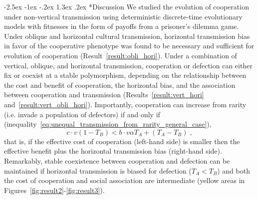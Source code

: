 \documentclass[12pt]{extarticle}
\makeatletter
\renewcommand\section{\@startsection {section}{1}{\z@}%
     {-2.5ex \@plus -1ex \@minus -.2ex}%
     {1.3ex \@plus.2ex}%
    {\Large\bfseries}}
\makeatother
\begin{document}
{\section*{Discussion}
We studied the evolution of cooperation under non-vertical transmission using deterministic discrete-time evolutionary models with fitnesses in the form of payoffs from a prisoner's dilemma game. 
Under oblique and horizontal cultural transmission, horizontal transmission bias in favor of the cooperative phenotype was found to be necessary and sufficient for evolution of cooperation (Result~\autoref{result:obli_hori}).
Under a combination of vertical, oblique, and horizontal transmission, cooperation or defection can either fix or coexist at a stable polymorphism, depending on the relationship between the cost and benefit of cooperation, the horizontal bias, and the association between cooperation and transmission (Results~\autoref{result:vert_hori} and~\autoref{result:vert_obli_hori}).
Importantly, cooperation can increase from rarity (i.e. invade a population of defectors) if and only if (inequality~\ref{eq:unequal_transmission_from_rarity_general_case}),
\begin{equation}
c \cdot v (1-T_B) < b \cdot v \alpha T_A + (T_A - T_B) \;,
\end{equation}
that is, if the effective cost of cooperation (left-hand side) is smaller then the effective benefit plus the horizontal transmission bias (right-hand side).
Remarkably, stable coexistence between cooperation and defection can be maintained if horizontal transmission is biased for defection ($T_A<T_B$) and both the cost of cooperation and social association are intermediate (yellow areas in Figures~\ref{fig:result2}-\ref{fig:result3}).

}
\end{document}
